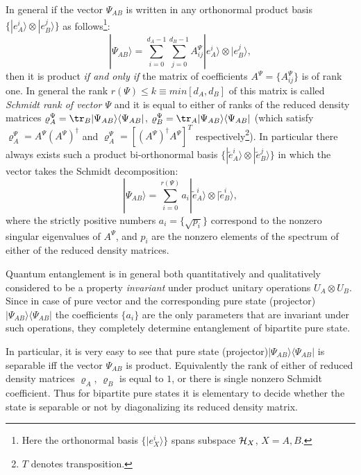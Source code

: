 \documentclass[twocolumn,aps,rmp]{revtex4}
\begin{document}
In general if the vector $\Psi_{AB}$ is written in any orthonormal
product basis $\{ |e_{A}^{i} \rangle \otimes |e_{B}^{j} \rangle \}$ as
follows\footnote{Here the orthonormal basis $\{ |e_{X}^{i} \rangle\}$
  spans subspace ${\cal H}_{X}$, $X=A,B$.}:
\begin{equation} |\Psi_{AB}\rangle =\sum_{i=0}^{d_{A}-1}\sum_{j=0}^{d_{B}-1}
A^{\Psi}_{ij} |e_{A}^{i} \rangle \otimes |e_{B}^{j} \rangle,
\end{equation}
then it is product {\it if and only if} the matrix of coefficients
$A^{\Psi}=\{ A^{\Psi}_{ij} \}$ is of rank one. In general the rank
$r(\Psi)\leq k\equiv min[d_{A},d_{B}]$ of this matrix is called {\it
  Schmidt rank of vector $\Psi$ } and it is equal to either of ranks
of the reduced density matrices
$\varrho_{A}^{\Psi}={\tr}_{B}|\Psi_{AB}\rangle \langle \Psi_{AB}|$,
$\varrho_{B}^{\Psi}={\tr}_{A}|\Psi_{AB}\rangle \langle \Psi_{AB}|$
(which satisfy $\varrho_{A}^{\Psi}=A^{\Psi}(A^{\Psi})^{\dagger}$ and
$\varrho_{A}^{\Psi}=[(A^{\Psi})^{\dagger}A^{\Psi}]^T$
respectively\footnote{$T$ denotes transposition.}). In particular
there always exists such a product bi-orthonormal basis $\{
|\tilde{e}_{A}^{i} \rangle \otimes |\tilde{e}_{B}^{j} \rangle \}$ in
which the vector takes the Schmidt decomposition:
\begin{equation}
|\Psi_{AB}\rangle =\sum_{i=0}^{r(\Psi)} a_{i} |\tilde{e}_{A}^{i}
\rangle \otimes |\tilde{e}_{B}^{i} \rangle,
\end{equation}
where the strictly positive numbers $a_{i}=\{ \sqrt{p_{i}} \}$
correspond to the nonzero singular eigenvalues \cite{Nielsen-Chuang}
of $A^{\Psi}$, and $ p_{i}$ are the nonzero elements of the spectrum
of either of the reduced density matrices.

Quantum entanglement is in general both quantitatively and
qualitatively considered to be a property {\it invariant} under
product unitary operations $U_{A} \otimes U_{B}$. Since in case of
pure vector and the corresponding pure state (projector)
$|\Psi_{AB}\rangle \langle \Psi_{AB}|$ the coefficients $\{a_{i}\}$
are the only parameters that are invariant under such operations, they
completely determine entanglement of bipartite pure state.

In particular, it is very easy to see that pure state
(projector)$|\Psi_{AB} \rangle \langle \Psi_{AB}|$ is separable iff
the vector $\Psi_{AB}$ is product. Equivalently the  rank of either
of reduced density matrices $\varrho_{A}$, $\varrho_{B}$ is
equal to $1$, or there is single nonzero Schmidt coefficient. Thus
for bipartite pure states it is elementary to decide whether the
state is separable or not by diagonalizing its reduced density
matrix.
\end{document}
